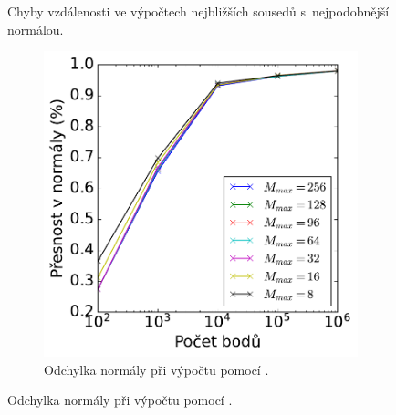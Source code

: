 \begin{figure}
\begin{subfigure}[t]{0.49\columnwidth}
\end{subfigure}
\caption{Chyby vzdálenosti ve výpočtech nejbližších sousedů s~nejpodobnější normálou.}
\label{fig:accurucybench_normal_distance}

\end{figure}


\begin{figure}
 
\begin{subfigure}[t]{0.49\columnwidth}
    \centering  
    \includegraphics[scale=0.6]{obrazky-figures/benchmark/accuracy/normal/acccurucy_first_err_normal.pdf}
    \caption{Odchylka normály při výpočtu pomocí .}


\end{subfigure}
\end{figure}

